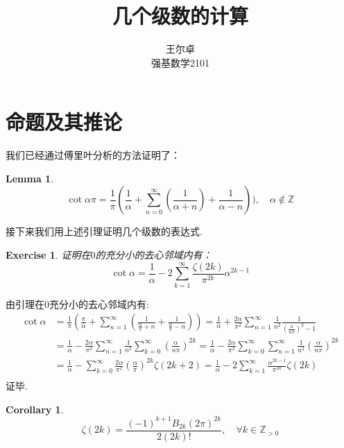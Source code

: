 \documentclass[a4paper,12pt]{ctexart}
\title{几个级数的计算}
\author{王尔卓 \\ 
强基数学2101}
\date{}
\newenvironment{prooff}{{\noindent\it\textcolor{cyan!40!black}{Proof}:}\quad}{\par}
\newtheorem{coro}[defn]{Corollary}
\newtheorem{exer}[defn]{Exercise}
\newtheorem{lem}[defn]{Lemma}
\newcommand{\bb}[1]{\mathbb{#1}}
\begin{document}
\maketitle
\section{命题及其推论}
我们已经通过傅里叶分析的方法证明了：
\begin{lem}
    \label{lem:cot}
    \begin{equation*}
        \cot \alpha \pi =\frac{1}{\pi}(\frac{1}{\alpha}+\sum_{n=0}^{\infty}(\frac{1}{\alpha+n})+\frac{1}{\alpha-n})),\quad \alpha \notin \bb{Z}
    \end{equation*}
\end{lem}
接下来我们用上述引理证明几个级数的表达式.
\begin{exer}
    证明在$0$的充分小的去心邻域内有：
    \begin{equation*}
        \cot \alpha =\frac{1}{\alpha}-2\sum_{k=1}^{\infty}\frac{\zeta (2k)}{\pi ^{2k}}\alpha^{2k-1}
    \end{equation*}
\end{exer}
\begin{prooff}
    由引理在$0$充分小的去心邻域内有:
    \begin{align*}
        \cot \alpha & =\frac{1}{\pi}(\frac{\pi}{\alpha}+\sum_{n=1}^{\infty}(\frac{1}{\frac{\alpha}{\pi}+n}+\frac{1}{\frac{\alpha}{\pi}-n}))
        =\frac{1}{\alpha}+\frac{2\alpha}{\pi^2}\sum_{n=1}^{\infty} \frac{1}{n^2}\frac{1}{(\frac{\alpha}{n\pi})^2-1}                          \\
                    & =\frac{1}{\alpha}-\frac{2\alpha}{\pi^2}\sum_{n=1}^{\infty} \frac{1}{n^2}\sum_{k=0}^{\infty} (\frac{\alpha}{n\pi})^{2k}
        =\frac{1}{\alpha}-\frac{2\alpha}{\pi^2}\sum_{k=0}^{\infty} \sum_{n=1}^{\infty} \frac{1}{n^2}(\frac{\alpha}{n\pi})^{2k}               \\
                    & =\frac{1}{\alpha}-\sum_{k=0}^{\infty}\frac{2\alpha}{\pi^2}(\frac{\alpha}{\pi})^{2k}\zeta(2k+2)
        =\frac{1}{\alpha}-2\sum_{k=1}^{\infty}\frac{\alpha^{2k-1}}{\pi^{2k}}\zeta(2k)                                                        \\
    \end{align*}
    证毕.
\end{prooff}
\begin{coro}
    \label{coro:zeta and bernoulli}
    \begin{equation*}
        \zeta(2k)=\frac{(-1)^{k+1}B_{2k}(2\pi)^{2k}}{2(2k)!},\quad \forall k\in \bb{Z}_{>0}
    \end{equation*}
\end{coro}
\end{document}
